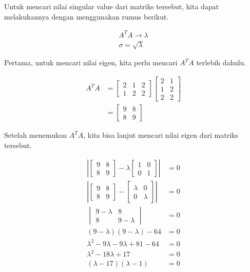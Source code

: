 \documentclass{article}
\begin{document}
Untuk mencari nilai singular value dari matriks tersebut, kita dapat melakukannya dengan menggunakan rumus berikut.

\begin{align*}
    A^TA \xrightarrow{} \lambda\\
    \sigma = \sqrt{\lambda}
\end{align*}

Pertama, untuk mencari nilai eigen, kita perlu mencari $A^TA$ terlebih dahulu.

\begin{align*}
A^TA &=
    \begin{bmatrix}
        2 & 1 & 2 \\
        1 & 2 & 2
    \end{bmatrix}
    \begin{bmatrix}
        2 & 1\\
        1 & 2\\
        2 & 2
    \end{bmatrix}\\
    &= 
    \begin{bmatrix}
        9 & 8\\
        8 & 9
    \end{bmatrix}
\end{align*}

Setelah menemukan $A^TA$, kita bisa lanjut mencari nilai eigen dari matriks tersebut.

\begin{align*}
    \left|
    \begin{bmatrix}
        9 & 8\\
        8 & 9
    \end{bmatrix}
    -
    \lambda
    \begin{bmatrix}
        1 & 0\\
        0 & 1
    \end{bmatrix}
    \right|
    &= 0\\
        \left|
    \begin{bmatrix}
        9 & 8\\
        8 & 9
    \end{bmatrix}
    -
    \begin{bmatrix}
        \lambda & 0\\
        0 & \lambda
    \end{bmatrix}
    \right|
    &= 0\\
    \begin{vmatrix}
        9 - \lambda& 8\\
        8 & 9-\lambda
    \end{vmatrix}
    &= 0\\
    (9-\lambda)(9-\lambda)-64 &= 0\\
    \lambda^2-9\lambda-9\lambda+81-64 &= 0\\
    \lambda^2-18\lambda+17&= 0\\
    (\lambda-17)(\lambda-1)&= 0\\
\end{align*}
\end{document}
